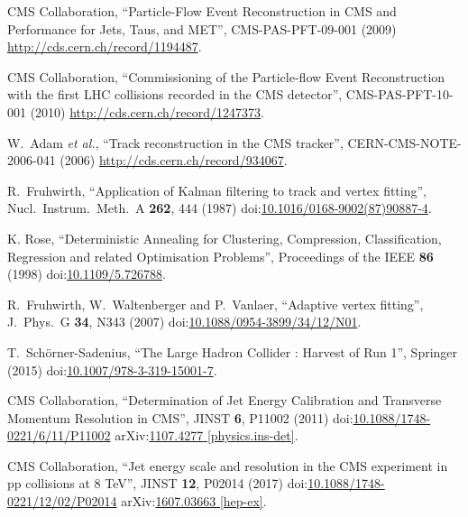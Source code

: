 \begin{thebibliography}{99}
CMS Collaboration, ``Particle-Flow Event Reconstruction in CMS and Performance for Jets, Taus, and MET'', CMS-PAS-PFT-09-001 (2009) \url{http://cds.cern.ch/record/1194487}.

CMS Collaboration, ``Commissioning of the Particle-flow Event Reconstruction with the first LHC collisions recorded in the CMS detector'', CMS-PAS-PFT-10-001 (2010) \url{http://cds.cern.ch/record/1247373}.

W.~Adam {\it et al.}, ``Track reconstruction in the CMS tracker'', CERN-CMS-NOTE-2006-041 (2006) \url{http://cds.cern.ch/record/934067}.

R.~Fruhwirth, ``Application of Kalman filtering to track and vertex fitting'', Nucl.\ Instrum.\ Meth.\ A {\bf 262}, 444 (1987) doi:\href{http://dx.doi.org/10.1016/0168-9002(87)90887-4}{10.1016/0168-9002(87)90887-4}.

K. Rose, ``Deterministic Annealing for Clustering, Compression, Classification, Regression and related Optimisation Problems'', Proceedings of the IEEE {\bf 86} (1998) doi:\href{http://dx.doi.org/10.1109/5.726788}{10.1109/5.726788}.

R.~Fruhwirth, W.~Waltenberger and P.~Vanlaer, ``Adaptive vertex fitting'', J.\ Phys.\ G {\bf 34}, N343 (2007) doi:\href{http://dx.doi.org/10.1088/0954-3899/34/12/N01}{10.1088/0954-3899/34/12/N01}.

T.~Schörner-Sadenius, ``The Large Hadron Collider : Harvest of Run 1'', Springer (2015) doi:\href{http://dx.doi.org/10.1007/978-3-319-15001-7}{10.1007/978-3-319-15001-7}.

CMS Collaboration, ``Determination of Jet Energy Calibration and Transverse Momentum Resolution in CMS'', JINST {\bf 6}, P11002 (2011) doi:\href{http://dx.doi.org/10.1088/1748-0221/6/11/P11002}{10.1088/1748-0221/6/11/P11002} arXiv:\href{http://arxiv.org/abs/arXiv:1107.4277}{1107.4277 [physics.ins-det]}.

CMS Collaboration, ``Jet energy scale and resolution in the CMS experiment in pp collisions at 8 TeV'', JINST {\bf 12}, P02014 (2017) doi:\href{http://dx.doi.org/10.1088/1748-0221/12/02/P02014}{10.1088/1748-0221/12/02/P02014} arXiv:\href{https://arxiv.org/abs/1607.03663}{1607.03663 [hep-ex]}.



\end{thebibliography}
